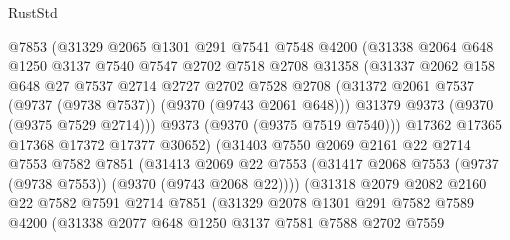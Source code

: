 \begin{lexlean}{RustStd}
\begin{coremodule}
                    @7853
                    (@31329
                      @2065
                      @1301
                      @291
                      @7541
                      @7548
                      @4200
                      (@31338
                        @2064
                        @648
                        @1250
                        @3137
                        @7540
                        @7547
                        @2702
                        @7518
                        @2708
                        @31358
                        (@31337
                          @2062
                          @158
                          @648
                          @27
                          @7537
                          @2714
                          @2727
                          @2702
                          @7528
                          @2708
                          (@31372 @2061 @7537 (@9737 (@9738 @7537)) (@9370 (@9743 @2061 @648)))
                          @31379
                          @9373
                          (@9370 (@9375 @7529 @2714)))
                        @9373
                        (@9370 (@9375 @7519 @7540)))
                      @17362
                      @17365
                      @17368
                      @17372
                      @17377
                      @30652)
                    (@31403
                      @7550
                      @2069
                      @2161
                      @22
                      @2714
                      @7553
                      @7582
                      @7851
                      (@31413
                        @2069
                        @22
                        @7553
                        (@31417 @2068 @7553 (@9737 (@9738 @7553)) (@9370 (@9743 @2068 @22))))
                      (@31318
                        @2079
                        @2082
                        @2160
                        @22
                        @7582
                        @7591
                        @2714
                        @7851
                        (@31329
                          @2078
                          @1301
                          @291
                          @7582
                          @7589
                          @4200
                          (@31338
                            @2077
                            @648
                            @1250
                            @3137
                            @7581
                            @7588
                            @2702
                            @7559

\end{coremodule}
\end{lexlean}
